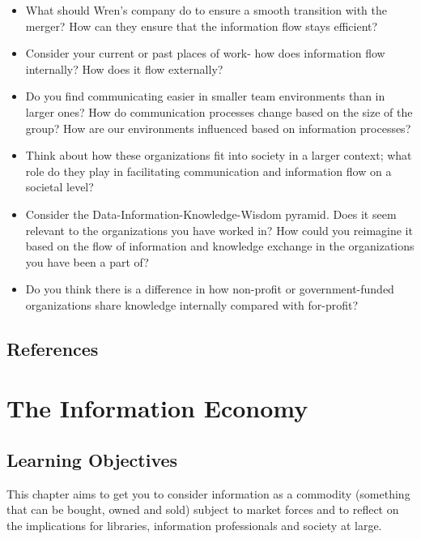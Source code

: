 \documentclass[
  letterpaper,
  DIV=11,
  numbers=noendperiod]{scrreprt}
\begin{document}
\begin{itemize}
\item
  What should Wren's company do to ensure a smooth transition with the
  merger? How can they ensure that the information flow stays efficient?
\item
  Consider your current or past places of work- how does information
  flow internally? How does it flow externally?
\item
  Do you find communicating easier in smaller team environments than in
  larger ones? How do communication processes change based on the size
  of the group? How are our environments influenced based on information
  processes?
\item
  Think about how these organizations fit into society in a larger
  context; what role do they play in facilitating communication and
  information flow on a societal level?
\item
  Consider the Data-Information-Knowledge-Wisdom pyramid. Does it seem
  relevant to the organizations you have worked in? How could you
  reimagine it based on the flow of information and knowledge exchange
  in the organizations you have been a part of?
\item
  Do you think there is a difference in how non-profit or
  government-funded organizations share knowledge internally compared
  with for-profit?
\end{itemize}

\section{References}\label{references-5}


\chapter{The Information Economy}\label{the-information-economy}

\section{Learning Objectives}\label{learning-objectives-5}

This chapter aims to get you to consider information as a commodity
(something that can be bought, owned and sold) subject to market forces
and to reflect on the implications for libraries, information
professionals and society at large.
\end{document}

